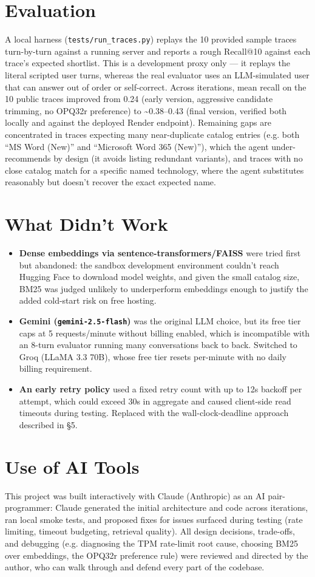 \documentclass[10pt]{article}
\begin{document}
\section{Evaluation}
A local harness (\texttt{tests/run\_traces.py}) replays the 10 provided sample traces turn-by-turn against a running server and reports a rough Recall@10 against each trace's expected shortlist. This is a development proxy only --- it replays the literal scripted user turns, whereas the real evaluator uses an LLM-simulated user that can answer out of order or self-correct. Across iterations, mean recall on the 10 public traces improved from 0.24 (early version, aggressive candidate trimming, no OPQ32r preference) to \textasciitilde0.38--0.43 (final version, verified both locally and against the deployed Render endpoint). Remaining gaps are concentrated in traces expecting many near-duplicate catalog entries (e.g. both ``MS Word (New)'' and ``Microsoft Word 365 (New)''), which the agent under-recommends by design (it avoids listing redundant variants), and traces with no close catalog match for a specific named technology, where the agent substitutes reasonably but doesn't recover the exact expected name.

\section{What Didn't Work}
\begin{itemize}
\item \textbf{Dense embeddings via sentence-transformers/FAISS} were tried first but abandoned: the sandbox development environment couldn't reach Hugging Face to download model weights, and given the small catalog size, BM25 was judged unlikely to underperform embeddings enough to justify the added cold-start risk on free hosting.
\item \textbf{Gemini (\texttt{gemini-2.5-flash})} was the original LLM choice, but its free tier caps at 5 requests/minute without billing enabled, which is incompatible with an 8-turn evaluator running many conversations back to back. Switched to Groq (LLaMA 3.3 70B), whose free tier resets per-minute with no daily billing requirement.
\item \textbf{An early retry policy} used a fixed retry count with up to 12s backoff per attempt, which could exceed 30s in aggregate and caused client-side read timeouts during testing. Replaced with the wall-clock-deadline approach described in \S5.
\end{itemize}

\section{Use of AI Tools}
This project was built interactively with Claude (Anthropic) as an AI pair-programmer: Claude generated the initial architecture and code across iterations, ran local smoke tests, and proposed fixes for issues surfaced during testing (rate limiting, timeout budgeting, retrieval quality). All design decisions, trade-offs, and debugging (e.g. diagnosing the TPM rate-limit root cause, choosing BM25 over embeddings, the OPQ32r preference rule) were reviewed and directed by the author, who can walk through and defend every part of the codebase.
\end{document}
